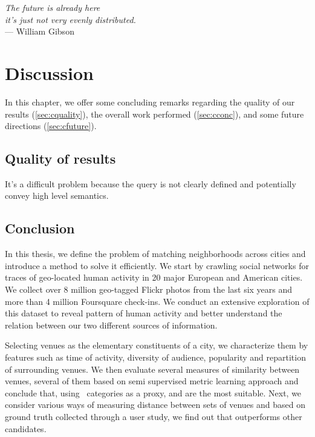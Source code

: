 \begin{flushright}{\slshape    
		The future is already here \\
		it's just not very evenly distributed.
    } \\ \medskip
    --- William Gibson
\end{flushright}

\chapter{Discussion}
\label{chap:discussion}

In this chapter, we offer some concluding remarks regarding the quality of our
results (\autoref{sec:cquality}), the overall work performed
(\autoref{sec:cconc}), and some future directions (\autoref{sec:cfuture}).

\section{Quality of results}
\label{sec:cquality}

It's a difficult problem because the query is not clearly defined and
potentially convey high level semantics.

\section{Conclusion}
\label{sec:cconc}

In this thesis, we define the problem of matching neighborhoods across cities
and introduce a method to solve it efficiently. We start by crawling social
networks for traces of geo-located human activity in 20 major European and
American cities. We collect over 8 million geo-tagged Flickr photos from the
last six years and more than 4 million Foursquare check-ins. We conduct an
extensive exploration of this dataset to reveal pattern of human activity and
better understand the relation between our two different sources of
information.

Selecting venues as the elementary constituents of a city, we characterize them
by features such as time of activity, diversity of audience, popularity and
repartition of surrounding venues. We then evaluate several measures of
similarity between venues, several of them based on semi supervised metric
learning approach and conclude that, using \fs\ categories as a proxy, \eucl{}
and \lmnn{} are the most suitable. Next, we consider various ways of measuring
distance between sets of venues and based on ground truth collected through a
user study, we find out that \emd{} outperforms other candidates.

